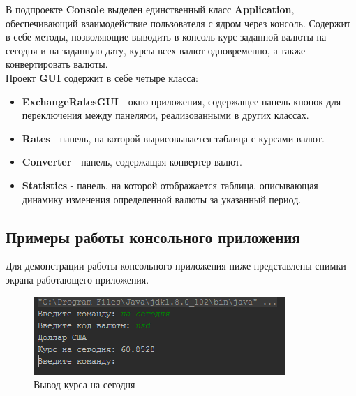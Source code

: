 \documentclass[a4paper]{article}
\begin{document}
В подпроекте \textbf{Console} выделен единственный класс \textbf{Application}, обеспечивающий взаимодействие пользователя с ядром через консоль. Содержит в себе методы, позволяющие выводить в консоль курс заданной валюты на сегодня и на заданную дату, курсы всех валют одновременно, а также конвертировать валюты.\\


Проект \textbf{GUI} содержит в себе четыре класса:

\begin{itemize}

\item \textbf{ExchangeRatesGUI} - окно приложения, содержащее панель кнопок для переключения между панелями, реализованными в других классах.

\item \textbf{Rates} - панель, на которой вырисовывается таблица с курсами валют.

\item \textbf{Converter} - панель, содержащая конвертер валют.

\item \textbf{Statistics} - панель, на которой отображается таблица, описывающая динамику изменения определенной валюты за указанный период. 

\end{itemize}

\subsection{Примеры работы консольного приложения}

Для демонстрации работы консольного приложения ниже представлены снимки экрана работающего приложения.

\begin{figure}[H]
	\begin{center}
		\includegraphics[scale=1.2]{screen/console_1.png}
		\caption{Вывод курса на сегодня} 
		\label{pic: console main menu} %
	\end{center}
\end{figure} 
\end{document}
